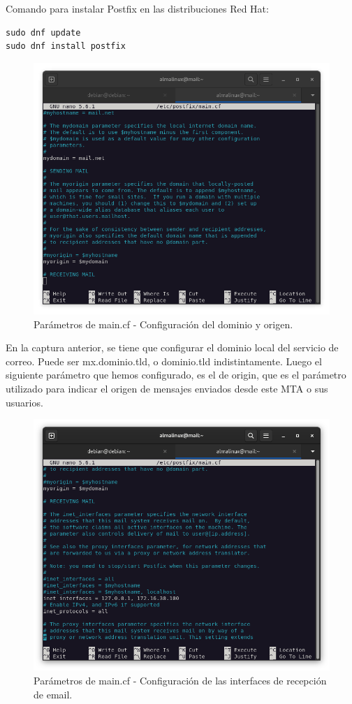 Comando para instalar Postfix en las distribuciones Red Hat:

\begin{lstlisting}[style=mybash]
sudo dnf update
sudo dnf install postfix
\end{lstlisting}

\begin{figure}[H]
	\centering
	\includegraphics[scale=0.30]{02}
	\caption{Parámetros de main.cf - Configuración del dominio y origen.}
\end{figure}

En la captura anterior, se tiene que configurar el dominio local del servicio de correo. Puede ser mx.dominio.tld, o dominio.tld indistintamente. Luego el siguiente parámetro que hemos configurado, es el de origin, que es el parámetro utilizado para indicar el origen de mensajes enviados desde este MTA o sus usuarios.

\begin{figure}[H]
	\centering
	\includegraphics[scale=0.30]{03}
	\caption{Parámetros de main.cf - Configuración de las interfaces de recepción de email.}
\end{figure}

